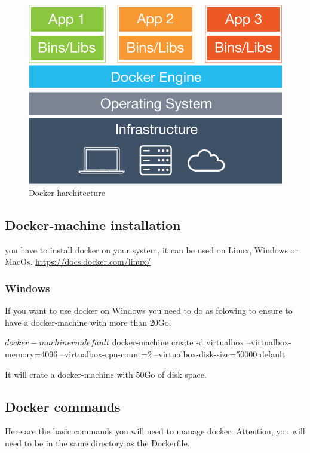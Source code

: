 \documentclass[a4paper,11pt]{report}
\begin{document}
\begin{figure}
	\begin{center}
		\includegraphics[scale=0.35]{img/what-is-vm-diagram}
		\caption{Docker harchitecture}
	\end{center}
\end{figure}

\subsection{Docker-machine installation}
you have to install docker on your system, it can be used on Linux, Windows or MacOs. \url{https://docs.docker.com/linux/}

\subsubsection{Windows}
If you want to use docker on Windows you need to do as folowing to ensure to have a docker-machine with more than 20Go.

\begin{javacode}
$ docker-machine rm default
$ docker-machine create -d virtualbox --virtualbox-memory=4096 --virtualbox-cpu-count=2 --virtualbox-disk-size=50000 default
\end{javacode}

It will crate a docker-machine with 50Go of disk space.

\subsection{Docker commands}
Here are the basic commands you will need to manage docker. Attention, you will need to be in the same directory as the Dockerfile.
\end{document}
